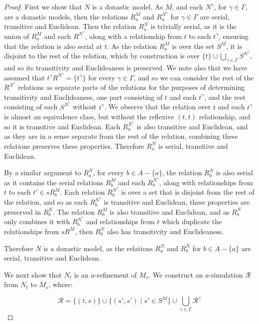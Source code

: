 \begin{proof}
First we show that $N$ is a doxastic model. As $M$, and each $N^\gamma$, for
$\gamma \in \Gamma$, are a doxastic models, then the relations $R^M_a$ and
$R^{N^\gamma}_a$ for $\gamma \in \Gamma$ are serial, transitive and Euclidean.
Then the relation $R^N_a$ is trivially serial, as it is the union of $R^M_a$ and
each $R^{N^\gamma}$, along with a relationship from $t$ to each $t^\gamma$,
ensuring that the relation is also serial at $t$.  As the relation $R^M_a$ is
over the set $S^M$, it is disjoint to the rest of the relation, which by
construction is over $\{t\} \cup \bigcup_{\gamma \in \Gamma} S^{N^\gamma}$, and
so its transitivity and Euclideaness is preserved. We note also that we have
assumed that $t^\gamma R^{N^\gamma} = \{t^\gamma\}$ for every $\gamma \in
\Gamma$, and so we can consider the rest of the $R^{N^\gamma}$ relations as
separate parts of the relations for the purposes of determining transitivity and
Euclideaness, one part consisting of $t$ and each $t^\gamma$, and the rest
consisting of each $S^{N^\gamma}$ without $t^\gamma$. We observe that the
relation over $t$ and each $t^\gamma$ is almost an equivalence class, but
without the reflexive $(t,t)$ relationship, and so it is transitive and
Euclidean. Each $R^{N^\gamma}_a$ is also transitive and Euclidean, and as they
are in a sense separate from the rest of the relation, combining these relations
preserves these properties. Therefore $R^N_a$ is serial, transitive and
Euclidean. 

By a similar argument to $R^N_a$, for every $b \in A - \{a\}$, the relation
$R^N_b$ is also serial as it contains the serial relations $R^M_b$ and each
$R^{N^\gamma}_b$, along with relationships from $t$ to each $t' \in sR^M_b$.
Each relation $R^{N^\gamma}_b$ is over a set that is disjoint from the rest of
the relation, and so as each $R^{N^\gamma}_b$ is transitive and Euclidean, these
properties are preserved in $R^N_b$. The relation $R^M_b$ is also transitive and
Euclidean, and as $R^N_b$ only combines it with $R^{N^\gamma}_b$ and
relationships from $t$ which duplicate the relationships from $sR^M$, then
$R^N_b$ also has transitivity and Euclideaness.

Therefore $N$ is a doxastic model, as the relations $R^N_a$ and $R^N_b$ for
$b \in A - \{a\}$ are serial, transitive and Euclidean.

We next show that $N_t$ is an $a$-refinement of $M_s$. We construct an
$a$-simulation $\mathcal{R}$ from $N_t$ to $M_s$, where:

$$\mathcal{R} = \{(t, s)\} \cup \{(s', s') \mid s' \in S^M \} \cup \bigcup_{\gamma \in \Gamma} \mathcal{R}^\gamma$$


\end{proof}
